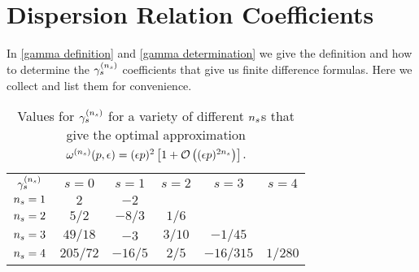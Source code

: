 \section{Dispersion Relation Coefficients}\label{sec:coefficients}

In \eqref{gamma definition} and \eqref{gamma determination} we give the definition and how to determine the $\gamma_s^{({n_s})}$ coefficients that give us finite difference formulas.  Here we collect and list them for convenience.

\begin{table}[ht]
    \caption{Values for $\gamma_s^{({n_s})}$ for a variety of different ${n_s}$s that give the optimal approximation $\omega^{({n_s})}(p,\epsilon) = (\epsilon p)^2\left[1+ \mathcal{O}\left((\epsilon p)^{2 {n_s}}\right)\right]$.}
    \label{tab:dispersion coefficients}
    \begin{tabular}{cccccc}
        $\gamma_s^{({n_s})}$   &   $s=0$   &   $s=1$   &   $s=2$   &   $s=3$       &   $s=4$   \\
        ${n_s}=1$              &   $2$     &   $-2$    &           &               &           \\
        ${n_s}=2$              &   $5/2$   &   $-8/3$  &   $1/6$   &               &           \\
        ${n_s}=3$              &   $49/18$ &   $-3$    &   $3/10$  &   $-1/45$     &           \\
        ${n_s}=4$              &   $205/72$&   $-16/5$ &   $2/5$   &   $-16/315$   &   $1/280$
    \end{tabular}
\end{table}
